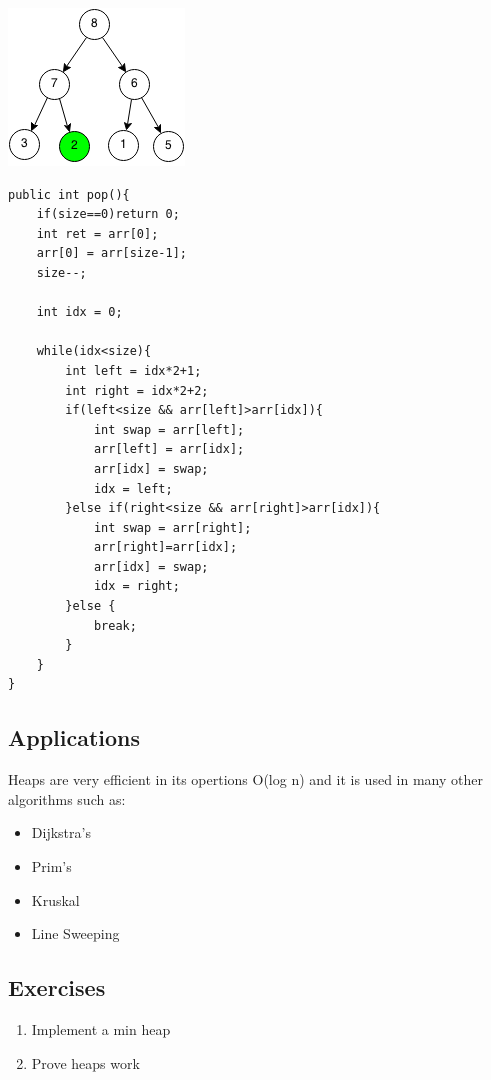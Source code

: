 \documentclass[11pt,oneside]{book}
\makeatletter
\def\maxwidth#1{\ifdim\Gin@nat@width>#1 #1\else\Gin@nat@width\fi}
\makeatother
\begin{document}
\vspace{5px}\includegraphics[width=\maxwidth{\textwidth}]{maxheappop3.png}

\begin{lstlisting}
public int pop(){
    if(size==0)return 0;
    int ret = arr[0];
    arr[0] = arr[size-1];
    size--;
        
    int idx = 0;
        
    while(idx<size){
        int left = idx*2+1;
        int right = idx*2+2;
        if(left<size && arr[left]>arr[idx]){
            int swap = arr[left];
            arr[left] = arr[idx];
            arr[idx] = swap;
            idx = left;
        }else if(right<size && arr[right]>arr[idx]){
            int swap = arr[right];
            arr[right]=arr[idx];
            arr[idx] = swap;
            idx = right;
        }else {
            break;
        }
    }
}
\end{lstlisting}

\subsection{Applications}

Heaps are very efficient in its opertions O(log n) and it is used in many other algorithms such as:

\begin{itemize}
\item Dijkstra's
\item Prim's
\item Kruskal
\item Line Sweeping
\end{itemize}

\subsection{Exercises}

\begin{enumerate}
\item Implement a min heap
\item Prove heaps work
\end{enumerate}
\end{document}
